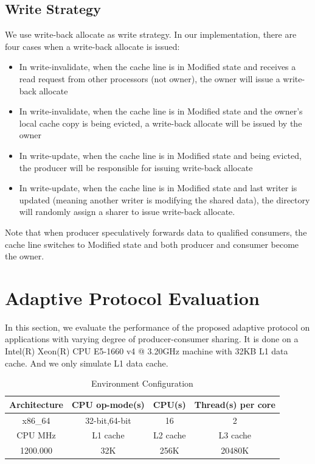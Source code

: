 \documentclass[11pt,conference]{IEEEtran}
\begin{document}
\subsection{Write Strategy}
We use write-back allocate as write strategy. In our implementation, there are four cases when a write-back allocate is issued:
\begin{itemize}
  \item In write-invalidate, when the cache line is in Modified state and receives a read request from other processors (not owner), the owner will issue a write-back allocate
  \item In write-invalidate, when the cache line is in Modified state and the owner's local cache copy is being evicted, a write-back allocate will be issued by the owner
  \item In write-update, when the cache line is in Modified state and being evicted, the producer will be responsible for issuing write-back allocate
  \item In write-update, when the cache line is in Modified state and last writer is updated (meaning another writer is modifying the shared data), the directory will randomly assign a sharer to issue write-back allocate.
\end{itemize}
Note that when producer speculatively forwards data to qualified consumers, the cache line switches to Modified state and both producer and consumer become the owner.


\section{Adaptive Protocol Evaluation}
In this section, we evaluate the performance of the proposed adaptive protocol on applications with varying degree of producer-consumer sharing. It is done on a Intel(R) Xeon(R) CPU E5-1660 v4 @ 3.20GHz machine with 32KB L1 data cache. And we only simulate L1 data cache.

\begin{table}[!h]
\renewcommand{\arraystretch}{2.5}
\caption{Environment  Configuration}
\label{envir_config}
\centering
\begin{tabular}{|c|c|c|c|}
\hline
Architecture & CPU op-mode(s) & CPU(s) & Thread(s) per core \\
\hline
x86\_64 & 32-bit,64-bit & 16 & 2 \\
\hline
CPU MHz & L1 cache & L2 cache & L3 cache \\
\hline
1200.000 & 32K & 256K & 20480K \\
\hline
\end{tabular}
\end{table}
\FloatBarrier
\end{document}
